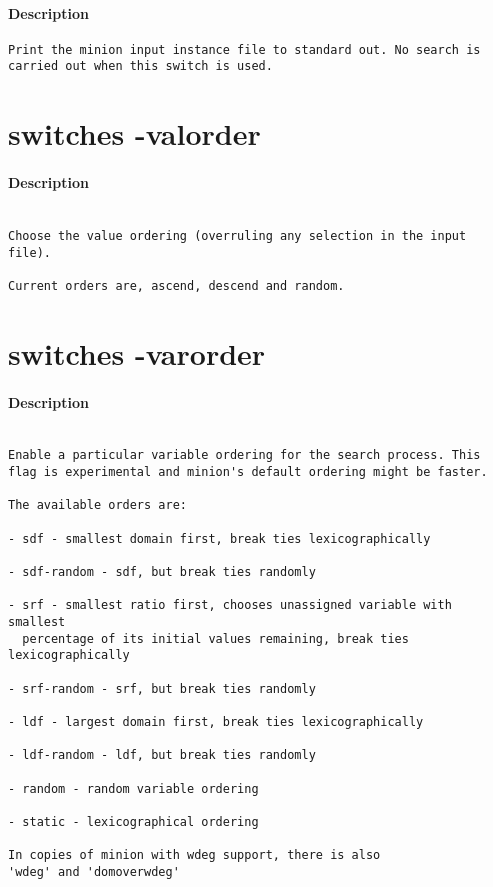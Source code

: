 \paragraph{Description}
{\footnotesize
\begin{verbatim}
Print the minion input instance file to standard out. No search is
carried out when this switch is used.
\end{verbatim}
}
\section{switches -valorder}
\paragraph{Description}
{\footnotesize
\begin{verbatim}

Choose the value ordering (overruling any selection in the input file).

Current orders are, ascend, descend and random.
\end{verbatim}
}
\section{switches -varorder}
\paragraph{Description}
{\footnotesize
\begin{verbatim}

Enable a particular variable ordering for the search process. This
flag is experimental and minion's default ordering might be faster.

The available orders are:

- sdf - smallest domain first, break ties lexicographically

- sdf-random - sdf, but break ties randomly

- srf - smallest ratio first, chooses unassigned variable with smallest
  percentage of its initial values remaining, break ties lexicographically

- srf-random - srf, but break ties randomly

- ldf - largest domain first, break ties lexicographically

- ldf-random - ldf, but break ties randomly

- random - random variable ordering

- static - lexicographical ordering

In copies of minion with wdeg support, there is also
'wdeg' and 'domoverwdeg'
\end{verbatim}
}
